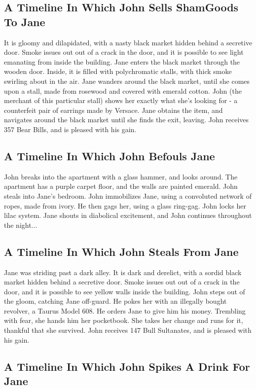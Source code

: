 \documentclass{article}
\begin{document}
\subsection{A Timeline In Which John Sells ShamGoods To Jane}


It is gloomy and dilapidated, with a nasty black market hidden behind a secretive door.
Smoke issues out out of a crack in the door, and it is possible to see light emanating from inside the building.
Jane enters the black market through the wooden door.
Inside, it is filled with polychromatic stalls, with thick smoke swirling about in the air.
Jane wanders around the black market, until she comes upon a stall, made from rosewood and covered with emerald cotton.
John (the merchant of this particular stall) shows her exactly what she's looking for {-} a counterfeit pair of earrings made by Versace.
Jane obtains the item, and navigates around the black market until she finds the exit, leaving.
John receives 357 Bear Bills, and is pleased with his gain.
\subsection{A Timeline In Which John Befouls Jane}


John breaks into the apartment with a glass hammer, and looks around.
The apartment has a purple carpet floor, and the walls are painted emerald.
John steals into Jane's bedroom.
John immobilizes Jane, using a convoluted network of ropes, made from ivory.
He then gags her, using a glass ring{-}gag.
John locks her lilac system.
Jane shouts in diabolical excitement, and John continues throughout the night...
\subsection{A Timeline In Which John Steals From Jane}


Jane was striding past a dark alley.
It is dark and derelict, with a sordid black market hidden behind a secretive door.
Smoke issues out out of a crack in the door, and it is possible to see yellow walls inside the building.
John steps out of the gloom, catching Jane off{-}guard.
He pokes her with an illegally bought revolver, a Taurus Model 608.
He orders Jane to give him his money.
Trembling with fear, she hands him her pocketbook.
She takes her change and runs for it, thankful that she survived.
John receives 147 Bull Sultanates, and is pleased with his gain.
\subsection{A Timeline In Which John Spikes A Drink For Jane}
\end{document}
